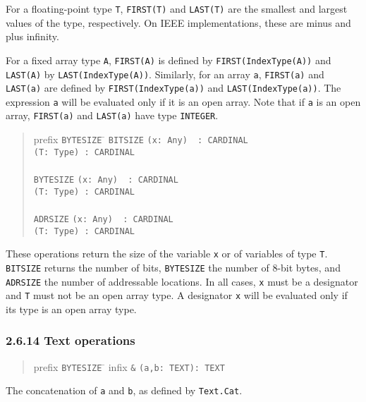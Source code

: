 \documentclass[10pt]{article}
\begin{document}
For a floating-point type \verb|T|, \verb|FIRST(T)| and \verb|LAST(T)| are the
smallest and largest values of the type, respectively.  On IEEE
implementations, these are minus and plus infinity.

For a fixed array type \verb|A|, \verb|FIRST(A)| is defined by
\verb|FIRST(IndexType(A))| and \verb|LAST(A)| by \verb|LAST(IndexType(A))|.
Similarly, for an array \verb|a|, \verb|FIRST(a)| and \verb|LAST(a)| are
defined by \verb|FIRST(IndexType(a))| and \verb|LAST(IndexType(a))|.  The
expression \verb|a| will be evaluated only if it is an open array.  Note that
if \verb|a| is an open array, \verb|FIRST(a)| and \verb|LAST(a)| have type
\verb|INTEGER|.

\begin{quote}
  \begin{tabbing}
    prefix \= \verb|BYTESIZE| \= \kill
    \> \verb|BITSIZE|  \> \verb|(x: Any)  : CARDINAL| \\
    \>                 \> \verb|(T: Type) : CARDINAL| \\
    \\
    \> \verb|BYTESIZE| \> \verb|(x: Any)  : CARDINAL| \\
    \>                 \> \verb|(T: Type) : CARDINAL| \\
    \\
    \> \verb|ADRSIZE|  \> \verb|(x: Any)  : CARDINAL| \\
    \>                 \> \verb|(T: Type) : CARDINAL|
  \end{tabbing}
\end{quote}
These operations return the size of the variable \verb|x| or of variables of
type \verb|T|.  \verb|BITSIZE| returns the number of bits, \verb|BYTESIZE| the
number of 8-bit bytes, and \verb|ADRSIZE| the number of addressable locations.
In all cases, \verb|x| must be a designator and \verb|T| must not be an open
array type.  A designator \verb|x| will be evaluated only if its type is an
open array type.

\subsubsection*{2.6.14 Text operations}

\begin{quote}
  \begin{tabbing}
    prefix \= \verb|BYTESIZE| \= \kill
    infix  \> \verb|&| \> \verb|(a,b: TEXT): TEXT|
  \end{tabbing}
\end{quote}
The concatenation of \verb|a| and \verb|b|, as defined by \verb|Text.Cat|.
\end{document}
